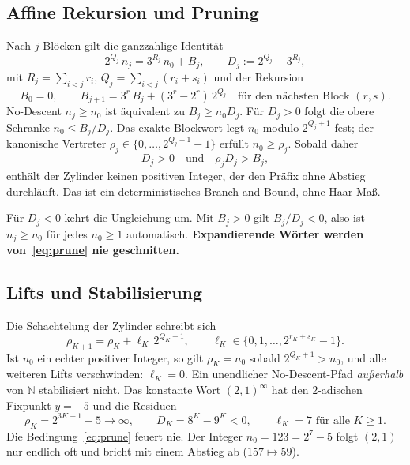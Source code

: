 \documentclass[11pt,reqno]{amsart}
\theoremstyle{definition}
\theoremstyle{remark}
\numberwithin{equation}{section}
\begin{document}
\subsection{Affine Rekursion und Pruning}

Nach $j$ Blöcken gilt die ganzzahlige Identität
\begin{equation}
\label{eq:affine_ND}
2^{Q_j}\, n_j
= 3^{R_j}\, n_0 + B_j,
\qquad
D_j := 2^{Q_j}-3^{R_j},
\end{equation}
mit $R_j=\sum_{i<j} r_i$, $Q_j=\sum_{i<j}(r_i+s_i)$ und der Rekursion
\begin{equation}
B_{0}=0,
\qquad
B_{j+1}
= 3^{r}\, B_j + (3^{r}-2^{r})\, 2^{Q_j}
\quad\text{für den nächsten Block }(r,s).
\end{equation}
No-Descent $n_j\ge n_0$ ist äquivalent zu $B_j\ge n_0 D_j$.
Für $D_j>0$ folgt die obere Schranke $n_0\le B_j/D_j$.
Das exakte Blockwort legt $n_0$ modulo $2^{Q_j+1}$ fest; der kanonische Vertreter $\rho_j\in\{0,\dots,2^{Q_j+1}-1\}$ erfüllt $n_0\ge\rho_j$.
Sobald daher
\begin{equation}
\label{eq:prune}
D_j>0
\quad\text{und}\quad
\rho_j D_j > B_j,
\end{equation}
enthält der Zylinder keinen positiven Integer, der den Präfix ohne Abstieg durchläuft.
Das ist ein deterministisches Branch-and-Bound, ohne Haar-Maß.

Für $D_j<0$ kehrt die Ungleichung um.
Mit $B_j>0$ gilt $B_j/D_j<0$, also ist $n_j\ge n_0$ für jedes $n_0\ge 1$ automatisch.
\textbf{Expandierende Wörter werden von~\eqref{eq:prune} nie geschnitten.}

\subsection{Lifts und Stabilisierung}

Die Schachtelung der Zylinder schreibt sich
\begin{equation}
\rho_{K+1}
= \rho_K + \ell_K\, 2^{Q_K+1},
\qquad
\ell_K\in\{0,1,\dots,2^{r_K+s_K}-1\}.
\end{equation}
Ist $n_0$ ein echter positiver Integer, so gilt $\rho_K=n_0$ sobald $2^{Q_K+1}>n_0$, und alle weiteren Lifts verschwinden: $\ell_K=0$.
Ein unendlicher No-Descent-Pfad \emph{außerhalb} von $\mathbb{N}$ stabilisiert nicht.
Das konstante Wort $(2,1)^{\infty}$ hat den $2$-adischen Fixpunkt $y=-5$ und die Residuen
\begin{equation}
\rho_K=2^{3K+1}-5\to\infty,
\qquad
D_K=8^K-9^K<0,
\qquad
\ell_K=7
\text{ für alle }K\ge 1.
\end{equation}
Die Bedingung~\eqref{eq:prune} feuert nie.
Der Integer $n_0=123=2^7-5$ folgt $(2,1)$ nur endlich oft und bricht mit einem Abstieg ab ($157\mapsto 59$).
\end{document}
